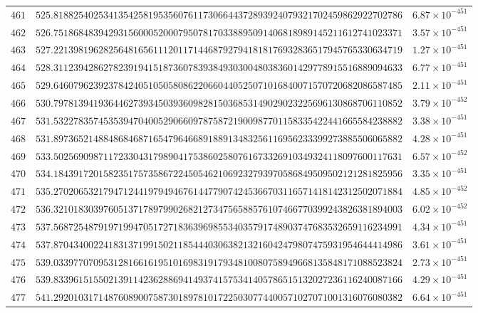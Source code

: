 \documentclass[12pt,reqno]{amsart}
\theoremstyle{remark}
\begin{document}
\begin{longtable}{clc}
$461$ & $525.8188254025341354258195356076117306644372893924079321702459862922702786$ & $6.87\times 10^{-451}$ \\
$462$ & $526.7518684839429315600052000795078170338895091406818989145211612741023371$ & $3.57\times 10^{-451}$ \\
$463$ & $527.2213981962825648165611120117144687927941818176932836517945765330634719$ & $1.27\times 10^{-451}$ \\
$464$ & $528.3112394286278239194151873607839384930300480383601429778915516889094633$ & $6.77\times 10^{-451}$ \\
$465$ & $529.6460796239237842405105058086220660440525071016840071570720682086587485$ & $2.11\times 10^{-451}$ \\
$466$ & $530.7978139419364462739345039360982815036853149029023225696130868706110852$ & $3.79\times 10^{-452}$ \\
$467$ & $531.5322783574535394704005290660978758721900987701158335422441665584238882$ & $3.38\times 10^{-451}$ \\
$468$ & $531.8973652148848684687165479646689188913483256116956233399273885506065882$ & $4.28\times 10^{-451}$ \\
$469$ & $533.5025690987117233043179890417538602580761673326910349324118097600117631$ & $6.57\times 10^{-452}$ \\
$470$ & $534.1843917201582351757358672245054621069232793970586849509502121281825956$ & $3.35\times 10^{-451}$ \\
$471$ & $535.2702065321794712441979494676144779074245366703116571418142312502071884$ & $4.85\times 10^{-452}$ \\
$472$ & $536.3210183039760513717897990268212734756588576107466770399243826381894003$ & $6.02\times 10^{-452}$ \\
$473$ & $537.5687254879197199470517271836396985534035791748903747683532659116234991$ & $4.34\times 10^{-451}$ \\
$474$ & $537.8704340022418313719915021185444030638213216042479807475931954644414986$ & $3.61\times 10^{-451}$ \\
$475$ & $539.0339770709531281661619510169831917934810080758949668135848171088523824$ & $2.73\times 10^{-451}$ \\
$476$ & $539.8339615155021391142362886941493741575341405786515132027236116240087166$ & $4.29\times 10^{-451}$ \\
$477$ & $541.2920103171487608900758730189781017225030774400571027071001316076080382$ & $6.64\times 10^{-451}$ \\

\end{longtable}
\end{document}

